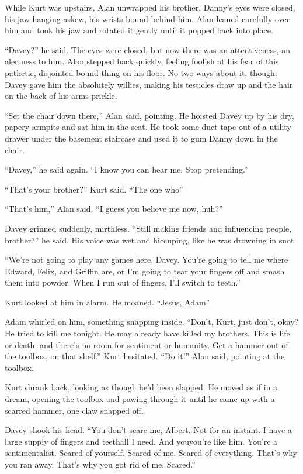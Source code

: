 While Kurt was upstairs, Alan unwrapped his brother.  Danny's eyes
were closed, his jaw hanging askew, his wrists bound behind him.  Alan
leaned carefully over him and took his jaw and rotated it gently until
it popped back into place.

``Davey?'' he said.  The eyes were closed, but now there was an
attentiveness, an alertness to him.  Alan stepped back quickly,
feeling foolish at his fear of this pathetic, disjointed bound thing
on his floor.  No two ways about it, though:  Davey gave him the
absolutely willies, making his testicles draw up and the hair on the
back of his arms prickle.

``Set the chair down there,'' Alan said, pointing.  He hoisted Davey
up by his dry, papery armpits and sat him in the seat.  He took some
duct tape out of a utility drawer under the basement staircase and
used it to gum Danny down in the chair.

``Davey,'' he said again.  ``I know you can hear me.  Stop
pretending.''

``That's your brother?'' Kurt said.  ``The one who\dash{}''

``That's him,'' Alan said.  ``I guess you believe me now, huh?''

Davey grinned suddenly, mirthless.  ``Still making friends and
influencing people, brother?'' he said.  His voice was wet and
hiccuping, like he was drowning in snot.

``We're not going to play any games here, Davey.  You're going to tell
me where Edward, Felix, and Griffin are, or I'm going to tear your
fingers off and smash them into powder.  When I run out of fingers,
I'll switch to teeth.''

Kurt looked at him in alarm.  He moaned.  ``Jesus, Adam\dash{}''

Adam whirled on him, something snapping inside.  ``Don't, Kurt, just
don't, okay?  He tried to kill me tonight.  He may already have killed
my brothers.  This is life or death, and there's no room for sentiment
or humanity.  Get a hammer out of the toolbox, on that shelf.'' Kurt
hesitated.  ``Do it!'' Alan said, pointing at the toolbox.

Kurt shrank back, looking as though he'd been slapped.  He moved as if
in a dream, opening the toolbox and pawing through it until he came up
with a scarred hammer, one claw snapped off.

Davey shook his head.  ``You don't scare me, Albert.  Not for an
instant.  I have a large supply of fingers and teeth\dash{}all I need. 
And you\dash{}you're like him.  You're a sentimentalist.  Scared of
yourself.  Scared of me.  Scared of everything.  That's why you ran
away.  That's why you got rid of me.  Scared.''

